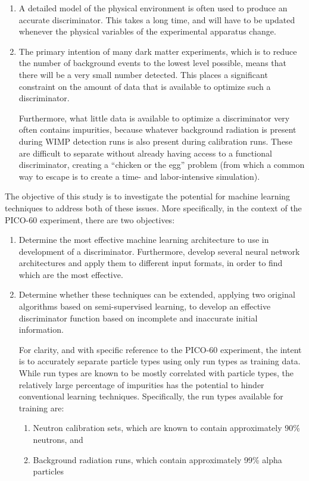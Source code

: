 \documentclass[10pt]{article}
\begin{document}
\begin{enumerate}
    \item A detailed model of the physical environment is often used to produce an accurate discriminator. This takes a long time, and will have to be updated whenever the physical variables of the experimental apparatus change.

    \item The primary intention of many dark matter experiments, which is to reduce the number of background events to the lowest level possible, means that there will be a very small number detected. This places a significant constraint on the amount of data that is available to optimize such a discriminator.

    Furthermore, what little data is available to optimize a discriminator very often contains impurities, because whatever background radiation is present during WIMP detection runs is also present during calibration runs. These are difficult to separate without already having access to a functional discriminator, creating a ``chicken or the egg'' problem (from which a common way to escape is to create a time- and labor-intensive simulation).
\end{enumerate}

The objective of this study is to investigate the potential for machine learning techniques to address both of these issues. More specifically, in the context of the PICO-60 experiment, there are two objectives:

\begin{enumerate}
    \item Determine the most effective machine learning architecture to use in development of a discriminator. Furthermore, develop several neural network architectures and apply them to different input formats, in order to find which are the most effective.

    \item Determine whether these techniques can be extended, applying two original algorithms based on semi-supervised learning, to develop an effective discriminator function based on incomplete and inaccurate initial information.
    
    For clarity, and with specific reference to the PICO-60 experiment, the intent is to accurately separate particle types using only run types as training data. While run types are known to be mostly correlated with particle types, the relatively large percentage of impurities has the potential to hinder conventional learning techniques. Specifically, the run types available for training are:

    \begin{enumerate}
        \item Neutron calibration sets, which are known to contain approximately 90\% neutrons, and
        \item Background radiation runs, which contain approximately 99\% alpha particles
    \end{enumerate}
\end{enumerate}
\end{document}

